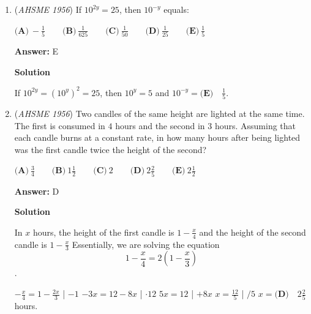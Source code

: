 \begin{enumerate}
 $\textbf{(A)}\ 5x,-11\qquad\textbf{(B)}\ -11,5x\qquad\textbf{(C)}\ -1,3\qquad\textbf{(D)}\ 3,-1\qquad\textbf{(E)}\ 5,-11$

 \textbf{Answer: }D



\textbf{Solution}

This is essentially asking for the partial fraction decomposition of 
 \[\frac{5x-11}{2x^2 + x - 6}\]Looking at $A$ and $B$, we can write
 \[A(2x-3) + B(x+2) = 5x-11\].Substituting $x= -2$, we get
 \[A(-4-3) + B(0) = -21 \Rrightarrow A = 3\]Substituting $x = \frac{3}{2}$, we get
 \[A(0) + B(\frac{7}{2}) = \frac{15}{2} - \frac{22}{2} \Rrightarrow B = -1\]Thus, our answer is $\boxed{D}$



	\item (\textit{AHSME 1956}) If $10^{2y} = 25$, then $10^{ - y}$ equals: 


 $\textbf{(A)}\ -\frac{1}{5}\qquad \textbf{(B)}\ \frac{1}{625}\qquad \textbf{(C)}\ \frac{1}{50}\qquad \textbf{(D)}\ \frac{1}{25}\qquad \textbf{(E)}\ \frac{1}{5}$

 \textbf{Answer: }E



\textbf{Solution}

If $10^{2y}=(10^{y})^2 = 25$, then $10^y = 5$ and $10^{-y} = \boxed{\textbf{(E)} \quad \frac{1}{5}}.$



	\item (\textit{AHSME 1956}) Two candles of the same height are lighted at the same time. The first is consumed in $4$ hours and the second in $3$ hours. 
Assuming that each candle burns at a constant rate, in how many hours after being lighted was the first candle twice the height of the second? 


 $\textbf{(A)}\ \frac{3}{4}\qquad\textbf{(B)}\ 1\frac{1}{2}\qquad\textbf{(C)}\ 2\qquad\textbf{(D)}\ 2\frac{2}{5}\qquad\textbf{(E)}\ 2\frac{1}{2}$

 \textbf{Answer: }D



\textbf{Solution}

In $x$ hours, the height of the first candle is $1 - \frac{x}{4}$ and the height of the second candle is $1 - \frac{x}{3}$ Essentially, we are solving the equation
 \[1 - \frac{x}{4} = 2(1 - \frac{x}{3})\].

 $- \frac{x}{4} = 1 - \frac{2x}{3}$ | $-1$
$- 3x = 12 - 8x$ | $\cdot 12$
$5x = 12$ | $+8x$
$x = \frac{12}{5}$ | $/5$
$x = \boxed{\textbf{(D)} \quad 2 \frac{2}{5}}$ hours.


\end{enumerate}
